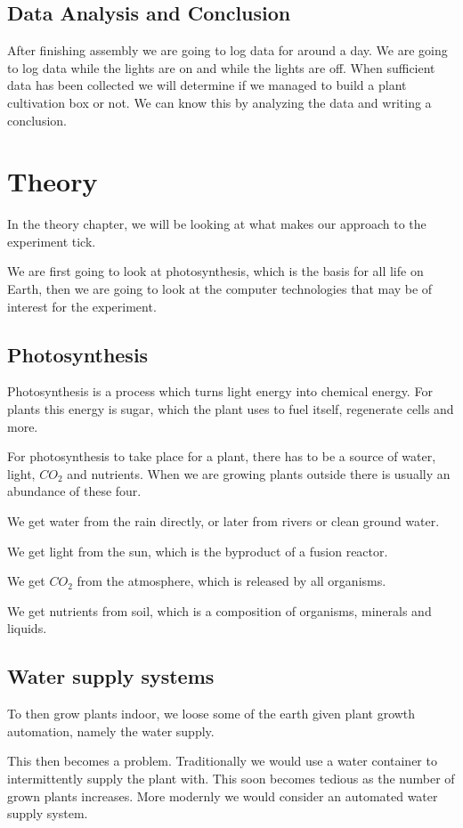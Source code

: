 \documentclass[12pt,a4paper,oneside]{book}
\begin{document}
\section{Data Analysis and Conclusion}
After finishing assembly we are going to log data for around a day. We are going to log data while the lights are on and while the lights are off. When sufficient data has been collected we will determine if we managed to build a plant cultivation box or not. We can know this by analyzing the data and writing a conclusion.

\chapter{Theory}
In the theory chapter, we will be looking at what makes our approach to the experiment tick.

We are first going to look at photosynthesis, which is the basis for all life on Earth, then we are going to look at the computer technologies that may be of interest for the experiment.

\section{Photosynthesis}
Photosynthesis is a process which turns light energy into chemical energy. For plants this energy is sugar, which the plant uses to fuel itself, regenerate cells and more.

For photosynthesis to take place for a plant, there has to be a source of water, light, $CO_2$ and nutrients.
When we are growing plants outside there is usually an abundance of these four.

We get water from the rain directly, or later from rivers or clean ground water.

We get light from the sun, which is the byproduct of a fusion reactor.

We get $CO_2$ from the atmosphere, which is released by all organisms.

We get nutrients from soil, which is a composition of organisms, minerals and liquids.

\section{Water supply systems}
To then grow plants indoor, we loose some of the earth given plant growth automation, namely the water supply.

This then becomes a problem. Traditionally we would use a water container to intermittently supply the plant with. This soon becomes tedious as the number of grown plants increases.
More modernly we would consider an automated water supply system.
\end{document}
